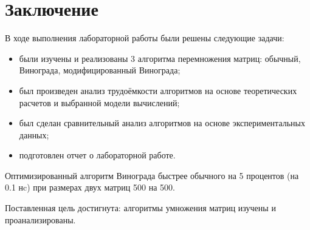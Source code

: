 \chapter*{Заключение}

В ходе выполнения лабораторной работы были решены следующие задачи:

\begin{itemize}
	\item были изучены и реализованы 3 алгоритма перемножения матриц: обычный, Винограда, модифицированный Винограда;
	
	\item был произведен анализ трудоёмкости алгоритмов на основе теоретических расчетов и выбранной модели вычислений;
	
	\item был сделан сравнительный анализ алгоритмов на основе экспериментальных данных;
	
	\item подготовлен отчет о лабораторной работе.
\end{itemize}

Оптимизированный алгоритм Винограда быстрее обычного на 5 процентов (на 0.1 нc)  при размерах двух матриц 500 на 500.

Поставленная цель достигнута: алгоритмы умножения матриц изучены и проанализированы.